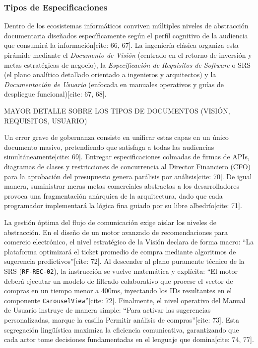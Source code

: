 \documentclass[11pt,a4paper]{article}
\begin{document}
	\subsubsection{Tipos de Especificaciones}
	Dentro de los ecosistemas informáticos conviven múltiples niveles de abstracción documentaria diseñados específicamente según el perfil cognitivo de la audiencia que consumirá la información[cite: 66, 67]. La ingeniería clásica organiza esta pirámide mediante el \textit{Documento de Visión} (centrado en el retorno de inversión y metas estratégicas de negocio), la \textit{Especificación de Requisitos de Software} o SRS (el plano analítico detallado orientado a ingenieros y arquitectos) y la \textit{Documentación de Usuario} (enfocada en manuales operativos y guías de despliegue funcional)[cite: 67, 68].
	
	MAYOR DETALLE SOBRE LOS TIPOS DE DOCUMENTOS (VISIÓN, REQUISITOS, USUARIO)
	
	Un error grave de gobernanza consiste en unificar estas capas en un único documento masivo, pretendiendo que satisfaga a todas las audiencias simultáneamente[cite: 69]. Entregar especificaciones colmadas de firmas de APIs, diagramas de clases y restricciones de concurrencia al Director Financiero (CFO) para la aprobación del presupuesto genera parálisis por análisis[cite: 70]. De igual manera, suministrar meras metas comerciales abstractas a los desarrolladores provoca una fragmentación anárquica de la arquitectura, dado que cada programador implementará la lógica fina guiado por su libre albedrío[cite: 71].
	
	La gestión óptima del flujo de comunicación exige aislar los niveles de abstracción. En el diseño de un motor avanzado de recomendaciones para comercio electrónico, el nivel estratégico de la Visión declara de forma macro: ``La plataforma optimizará el ticket promedio de compra mediante algoritmos de sugerencia predictivos''[cite: 72]. Al descender al plano puramente técnico de la SRS (\texttt{RF-REC-02}), la instrucción se vuelve matemática y explícita: ``El motor deberá ejecutar un modelo de filtrado colaborativo que procese el vector de compras en un tiempo menor a 400ms, inyectando los IDs resultantes en el componente \texttt{CarouselView}''[cite: 72]. Finalmente, el nivel operativo del Manual de Usuario instruye de manera simple: ``Para activar las sugerencias personalizadas, marque la casilla Permitir análisis de compras''[cite: 73]. Esta segregación lingüística maximiza la eficiencia comunicativa, garantizando que cada actor tome decisiones fundamentadas en el lenguaje que domina[cite: 74, 77].
	
\end{document}
